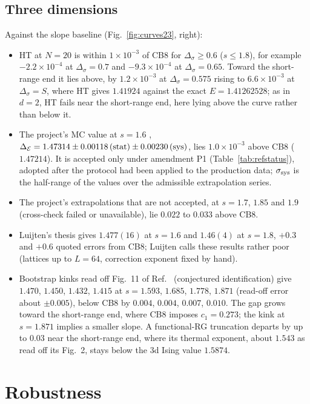 \documentclass[11pt,a4paper]{article}
\numberwithin{equation}{section}
\newcommand{\De}{\Delta_{\mathcal E}}   %
\newcommand{\Ds}{\Delta_\sigma}
\newcommand{\sci}[2]{#1\times10^{#2}}
\begin{document}
\subsection{Three dimensions}
Against the slope baseline (Fig.~\ref{fig:curves23}, right):
\begin{itemize}
\item HT at $N=20$ is within $\sci{1}{-3}$ of CB8 for $\Ds\ge0.6$ ($s\le1.8$), for example
$\sci{-2.2}{-4}$ at $\Ds=0.7$ and $\sci{-9.3}{-4}$ at $\Ds=0.65$. Toward the short-range end
it lies above, by $\sci{1.2}{-3}$ at $\Ds=0.575$ rising to $\sci{6.6}{-3}$ at $\Ds=S$, where HT
gives $1.41924$ against the exact $E=1.41262528$; as in $d=2$, HT fails near the short-range
end, here lying above the curve rather than below it.
\item The project's MC value at $s=1.6$ \cite{noteMC}, $\De=1.47314\pm0.00118\,({\rm
stat})\pm0.00230\,({\rm sys})$, lies $\sci{1.0}{-3}$ above CB8 ($1.47214$). It is accepted
only under amendment P1 (Table~\ref{tab:refstatus}), adopted after the protocol had been
applied to the production data; $\sigma_{\rm sys}$ is the half-range of the values over the
admissible extrapolation series.
\item The project's extrapolations that are not accepted, at $s=1.7$, $1.85$ and $1.9$
(cross-check failed or unavailable), lie $0.022$ to $0.033$ above CB8.
\item Luijten's thesis gives $1.477(16)$ at $s=1.6$ and $1.46(4)$ at $s=1.8$, $+0.3$ and
$+0.6$ quoted errors from CB8; Luijten calls these results rather poor (lattices up to
$L=64$, correction exponent fixed by hand).
\item Bootstrap kinks read off Fig.~11 of Ref.~\cite{Behan:2023ile} (conjectured
identification) give $1.470$, $1.450$, $1.432$, $1.415$ at $s=1.593$, $1.685$, $1.778$,
$1.871$ (read-off error about $\pm0.005$), below CB8 by $0.004$, $0.004$, $0.007$, $0.010$. The
gap grows toward the short-range end, where CB8 imposes $c_1=0.273$; the kink at $s=1.871$
implies a smaller slope. A functional-RG truncation \cite{Defenu:2014bea} departs by up to
$0.03$ near the short-range end, where its thermal exponent, about $1.543$ as read off its
Fig.~2, stays below the 3d Ising value $1.5874$.
\end{itemize}

\section{Robustness}\label{sec:robust}
\end{document}
